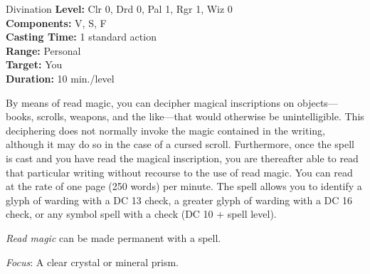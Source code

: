 {Divination}
{
	\textbf{Level:}
	Clr 0, Drd 0, Pal 1, Rgr 1, Wiz 0\\
	\textbf{Components:}
	V, S, F\\
	\textbf{Casting Time:}
	1 standard action\\
	\textbf{Range:}
	Personal\\
	\textbf{Target:}
	You\\
	\textbf{Duration:}
	10 min./level\\
}
{
	By means of read magic, you can decipher magical inscriptions on objects---books, scrolls, weapons, and the like---that would otherwise be unintelligible. This deciphering does not normally invoke the magic contained in the writing, although it may do so in the case of a cursed scroll. Furthermore, once the spell is cast and you have read the magical inscription, you are thereafter able to read that particular writing without recourse to the use of read magic. You can read at the rate of one page (250 words) per minute. The spell allows you to identify a glyph of warding with a DC 13  check, a greater glyph of warding with a DC 16  check, or any symbol spell with a  check (DC 10 + spell level).

	\emph{Read magic} can be made permanent with a  spell.

	\textit{Focus}:
	A clear crystal or mineral prism.

}
